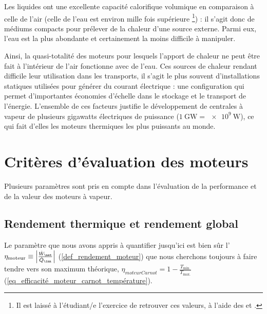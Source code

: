 	Les liquides ont une excellente capacité calorifique volumique en comparaison à celle de l’air (celle de l’eau est environ mille fois supérieure%
		\footnote{Il est laissé à l’étudiant/e l’exercice de retrouver ces valeurs, à l’aide des \coursquatre et \courscinq.}) : il s’agit donc de médiums compacts pour prélever de la chaleur d’une source externe. Parmi eux, l’eau est la plus abondante et certainement la moins difficile à manipuler. 

	Ainsi, la quasi-totalité des moteurs pour lesquels l’apport de chaleur ne peut être fait à l’intérieur de l’air fonctionne avec de l’eau. Ces sources de chaleur rendant difficile leur utilisation dans les transports, il s’agit le plus souvent d’installations statiques utilisées pour générer du courant électrique : une configuration qui permet d’importantes économies d’échelle dans le stockage et le transport de l’énergie. L’ensemble de ces facteurs justifie le développement de centrales à vapeur de plusieurs \si{gigawatts} électriques de puissance ($\SI{1}{\giga\watt} = \SI{e9}{\watt}$), ce qui fait d’elles les moteurs thermiques les plus puissants au monde.


\section{Critères d’évaluation des moteurs}
\label{ch_evaluation_moteurs_vapeur}

	Plusieurs paramètres sont pris en compte dans l’évaluation de la performance et de la valeur des moteurs à vapeur.

	\subsection{Rendement thermique et rendement global}

		Le paramètre que nous avons appris à quantifier jusqu’ici est bien sûr l’ $\eta_\text{moteur} \equiv \left| \frac{\dot{W}_\net}{\dot{Q}_\inn} \right|$ (\ref{def_rendement_moteur}) que nous cherchons toujours à faire tendre vers son maximum théorique, $\eta _{moteur Carnot} = 1 - \frac{T_\text{min.}}{T_\text{max.}}$ (\ref{eq_efficacité_moteur_carnot_température}).
		
